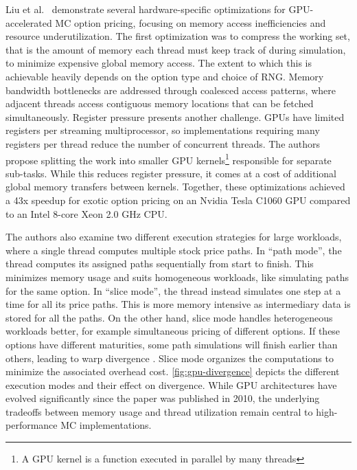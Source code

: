 \documentclass[english,12pt,a4paper,pdftex,sci,utf8]{aaltothesis}
\begin{document}
Liu et al.\ \cite{liu2010efficient} demonstrate several hardware-specific optimizations for GPU-accelerated MC option pricing, focusing on memory access inefficiencies and resource underutilization. The first optimization was to compress the working set, that is the amount of memory each thread must keep track of during simulation, to minimize expensive global memory access. The extent to which this is achievable heavily depends on the option type and choice of RNG. Memory bandwidth bottlenecks are addressed through coalesced access patterns, where adjacent threads access contiguous memory locations that can be fetched simultaneously. Register pressure presents another challenge. GPUs have limited registers per streaming multiprocessor, so implementations requiring many registers per thread reduce the number of concurrent threads. The authors propose splitting the work into smaller GPU kernels\footnote{A GPU kernel is a function executed in parallel by many threads} responsible for separate sub-tasks. While this reduces register pressure, it comes at a cost of additional global memory transfers between kernels. Together, these optimizations achieved a 43x speedup for exotic option pricing on an Nvidia Tesla C1060 GPU compared to an Intel 8-core Xeon 2.0 GHz CPU.

The authors also examine two different execution strategies for large workloads, where a single thread computes multiple stock price paths. In ``path mode'', the thread computes its assigned paths sequentially from start to finish. This minimizes memory usage and suits homogeneous workloads, like simulating paths for the same option. In ``slice mode'', the thread instead simulates one step at a time for all its price paths. This is more memory intensive as intermediary data is stored for all the paths. On the other hand, slice mode handles heterogeneous workloads better, for example simultaneous pricing of different options. If these options have different maturities, some path simulations will finish earlier than others, leading to warp divergence \cite{liu2010efficient}. Slice mode organizes the computations to minimize the associated overhead cost. \cref{fig:gpu-divergence} depicts the different execution modes and their effect on divergence. While GPU architectures have evolved significantly since the paper was published in 2010, the underlying tradeoffs between memory usage and thread utilization remain central to high-performance MC implementations.
\end{document}
